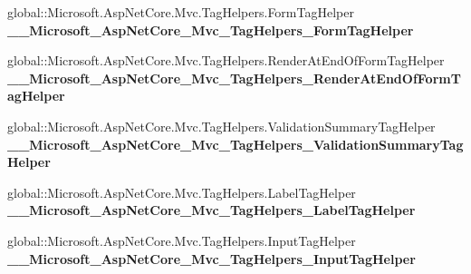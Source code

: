 \begin{DoxyCompactItemize}
global\+::\+Microsoft.\+Asp\+Net\+Core.\+Mvc.\+Tag\+Helpers.\+Form\+Tag\+Helper {\bfseries \+\_\+\+\_\+\+Microsoft\+\_\+\+Asp\+Net\+Core\+\_\+\+Mvc\+\_\+\+Tag\+Helpers\+\_\+\+Form\+Tag\+Helper}
\item 
\mbox{\label{class_projeto_e_s_w_1_1_areas_1_1_identity_1_1_pages_1_1_account_1_1_manage_1_1_areas___identityf71e623a7e7907515cd465c2fe005b76_a7fcca5c26f3b9914c0e83f0ebcfe4110}} 
global\+::\+Microsoft.\+Asp\+Net\+Core.\+Mvc.\+Tag\+Helpers.\+Render\+At\+End\+Of\+Form\+Tag\+Helper {\bfseries \+\_\+\+\_\+\+Microsoft\+\_\+\+Asp\+Net\+Core\+\_\+\+Mvc\+\_\+\+Tag\+Helpers\+\_\+\+Render\+At\+End\+Of\+Form\+Tag\+Helper}
\item 
\mbox{\label{class_projeto_e_s_w_1_1_areas_1_1_identity_1_1_pages_1_1_account_1_1_manage_1_1_areas___identityf71e623a7e7907515cd465c2fe005b76_a987c9f73f84b16973a8d98911ae80e3a}} 
global\+::\+Microsoft.\+Asp\+Net\+Core.\+Mvc.\+Tag\+Helpers.\+Validation\+Summary\+Tag\+Helper {\bfseries \+\_\+\+\_\+\+Microsoft\+\_\+\+Asp\+Net\+Core\+\_\+\+Mvc\+\_\+\+Tag\+Helpers\+\_\+\+Validation\+Summary\+Tag\+Helper}
\item 
\mbox{\label{class_projeto_e_s_w_1_1_areas_1_1_identity_1_1_pages_1_1_account_1_1_manage_1_1_areas___identityf71e623a7e7907515cd465c2fe005b76_a75072b1ea82218e2f4dada84c1410814}} 
global\+::\+Microsoft.\+Asp\+Net\+Core.\+Mvc.\+Tag\+Helpers.\+Label\+Tag\+Helper {\bfseries \+\_\+\+\_\+\+Microsoft\+\_\+\+Asp\+Net\+Core\+\_\+\+Mvc\+\_\+\+Tag\+Helpers\+\_\+\+Label\+Tag\+Helper}
\item 
\mbox{\label{class_projeto_e_s_w_1_1_areas_1_1_identity_1_1_pages_1_1_account_1_1_manage_1_1_areas___identityf71e623a7e7907515cd465c2fe005b76_a9bd3056cbb7918e3a6b9661a2d891aed}} 
global\+::\+Microsoft.\+Asp\+Net\+Core.\+Mvc.\+Tag\+Helpers.\+Input\+Tag\+Helper {\bfseries \+\_\+\+\_\+\+Microsoft\+\_\+\+Asp\+Net\+Core\+\_\+\+Mvc\+\_\+\+Tag\+Helpers\+\_\+\+Input\+Tag\+Helper}

\end{DoxyCompactItemize}
